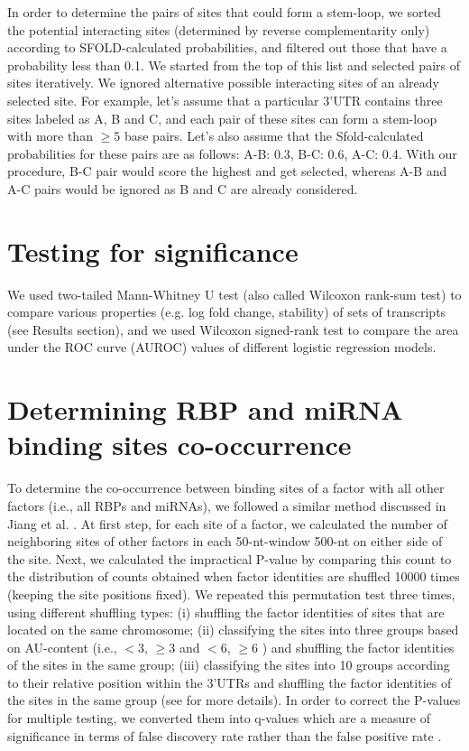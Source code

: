 In order to determine the pairs of sites that could form a stem-loop, we sorted the potential interacting sites (determined by reverse complementarity only) according to SFOLD-calculated probabilities, and filtered out those that have a probability less than 0.1. We started from the top of this list and selected pairs of sites iteratively. We ignored alternative possible interacting sites of an already selected site. For example, let's assume that a particular 3'UTR contains three sites labeled as A, B and C, and each pair of these sites can form a stem-loop with more than  $\geq 5$ base pairs. Let's also assume that the Sfold-calculated probabilities for these pairs are as follows: A-B: 0.3, B-C: 0.6, A-C: 0.4. With our procedure, B-C pair would score the highest and get selected, whereas A-B and A-C pairs would be ignored as B and C are already considered. 

\section{Testing for significance}
We used two-tailed Mann-Whitney U test (also called Wilcoxon rank-sum test) to compare various properties (e.g. log fold change, stability) of sets of transcripts (see Results section), and we used Wilcoxon signed-rank test to compare the area under the ROC curve (AUROC) values of different logistic regression models.

\section{Determining RBP and miRNA binding sites co-occurrence}

To determine the co-occurrence between binding sites of a factor with all other factors (i.e., all RBPs and miRNAs), we followed a similar method discussed in Jiang et al. \cite{jiang_13}. At first step, for each site of a factor, we calculated the number of neighboring sites of other factors in each 50-nt-window 500-nt on either side of the site. Next, we calculated the impractical P-value by comparing this count to the distribution of counts obtained when factor identities are shuffled 10000 times (keeping the site positions fixed). We repeated this permutation test three times, using different shuffling types: (i) shuffling the factor identities of sites that are located on the same chromosome; (ii) classifying the sites into three groups based on AU-content (i.e., $<3$,  $\geq 3$ and $< 6$, $\geq 6$ ) and shuffling the factor identities of the sites in the same group; (iii) classifying the sites into 10 groups according to their relative position within the 3'UTRs and shuffling the factor identities of the sites in the same group (see \cite{jiang_13} for more details). In order to correct the P-values for multiple testing, we converted them into q-values which are a measure of significance in terms of false discovery rate rather than the false positive rate \cite{qvalue}.

